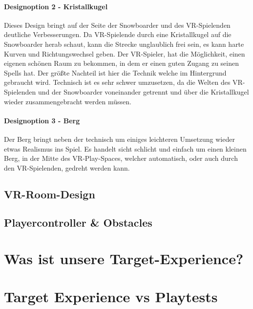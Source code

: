 \paragraph{Designoption 2 - Kristallkugel}

Dieses Design bringt auf der Seite der Snowboarder und des VR-Spielenden deutliche Verbesserungen. Da VR-Spielende durch eine Kristallkugel auf die Snowboarder herab schaut, kann die Strecke unglaublich frei sein, es kann harte Kurven und Richtungswechsel geben. Der VR-Spieler, hat die Möglichkeit, einen eigenen schönen Raum zu bekommen, in dem er einen guten Zugang zu seinen Spells hat. Der größte Nachteil ist hier die Technik welche im Hintergrund gebraucht wird. Technisch ist es sehr schwer umzusetzen, da die Welten des VR-Spielenden und der Snowboarder voneinander getrennt und über die Kristallkugel wieder zusammengebracht werden müssen.

\paragraph{Designoption 3 - Berg}

Der Berg bringt neben der technisch um einiges leichteren Umsetzung wieder etwas Realismus ins Spiel. Es handelt sicht schlicht und einfach um einen kleinen Berg, in der Mitte des VR-Play-Spaces, welcher automatisch, oder auch durch den VR-Spielenden, gedreht werden kann.

\subsection{VR-Room-Design}

\subsection{Playercontroller \& Obstacles}

\section{Was ist unsere Target-Experience?}

\section{Target Experience vs Playtests}
